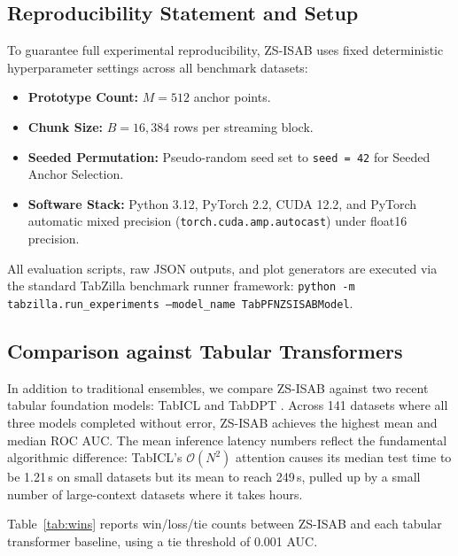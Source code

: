 \documentclass{article}
\begin{document}
\subsection{Reproducibility Statement and Setup}

To guarantee full experimental reproducibility, ZS-ISAB uses fixed deterministic hyperparameter settings across all benchmark datasets:
\begin{itemize}
    \item \textbf{Prototype Count:} $M = 512$ anchor points.
    \item \textbf{Chunk Size:} $B = 16{,}384$ rows per streaming block.
    \item \textbf{Seeded Permutation:} Pseudo-random seed set to \texttt{seed = 42} for Seeded Anchor Selection.
    \item \textbf{Software Stack:} Python 3.12, PyTorch 2.2, CUDA 12.2, and PyTorch automatic mixed precision (\texttt{torch.cuda.amp.autocast}) under float16 precision.
\end{itemize}
All evaluation scripts, raw JSON outputs, and plot generators are executed via the standard TabZilla benchmark runner framework: \texttt{python -m tabzilla.run\_experiments --model\_name TabPFNZSISABModel}.

\subsection{Comparison against Tabular Transformers}

In addition to traditional ensembles, we compare ZS-ISAB against two recent tabular foundation models: TabICL \citep{huang2024tabicl} and TabDPT \citep{ma2024tabdpt}. Across 141 datasets where all three models completed without error, ZS-ISAB achieves the highest mean and median ROC AUC. The mean inference latency numbers reflect the fundamental algorithmic difference: TabICL's $\mathcal{O}(N^2)$ attention causes its median test time to be 1.21\,s on small datasets but its mean to reach 249\,s, pulled up by a small number of large-context datasets where it takes hours.

Table~\ref{tab:wins} reports win/loss/tie counts between ZS-ISAB and each tabular transformer baseline, using a tie threshold of 0.001 AUC.
\end{document}
